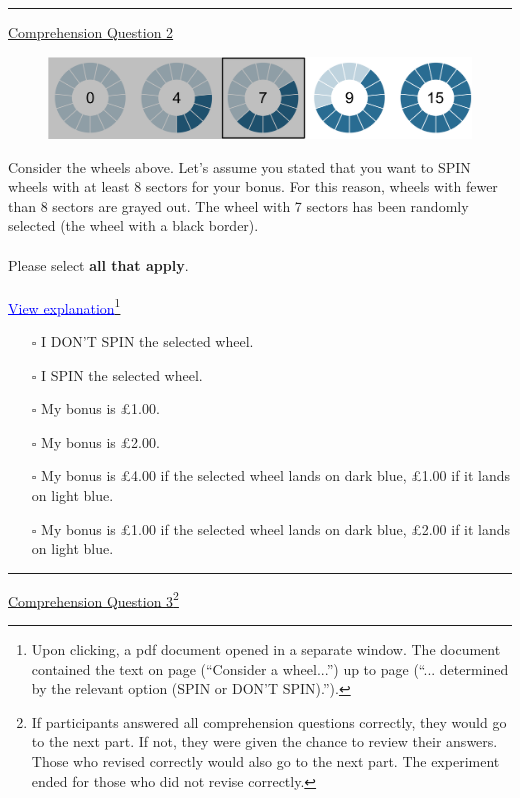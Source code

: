 \documentclass[pdftex,12pt, a4paper]{article}
\begin{document}
\noindent \rule{\linewidth}{0.4pt}
\newpage
\noindent \underline{Comprehension Question 2}

\begin{figure}[h!]
	\centering
	{\includegraphics[width=\linewidth]{Fig7_five_wheelsS2_15.pdf}}
\end{figure}
 
\noindent Consider the wheels above.
Let's assume you stated that you want to SPIN wheels with at least 8 sectors for your bonus.
For this reason, wheels with fewer than 8 sectors are grayed out.
The wheel with 7 sectors has been randomly selected (the wheel with a black border).\\
\\
\noindent Please select \textbf{all that apply}.\\
 \\
\noindent \textcolor{blue}{\underline{View explanation}}\footnote{
Upon clicking, a pdf document opened in a separate window.
The document contained the text on page \pageref{explanation} (``Consider a wheel...'') up to page \pageref{end} (``... determined by the relevant option (SPIN or DON'T SPIN).'').
}\\
\begin{itemize}
\item[$\square$] I DON'T SPIN the selected wheel.
\item[$\square$] I SPIN the selected wheel.
\item[$\square$] My bonus is £1.00.
\item[$\square$] My bonus is £2.00.
\item[$\square$] My bonus is £4.00 if the selected wheel lands on dark blue, £1.00 if it lands on light blue.
\item[$\square$] My bonus is £1.00 if the selected wheel lands on dark blue, £2.00 if it lands on light blue.
\end{itemize}

\noindent \rule{\linewidth}{0.4pt}
\newpage
\noindent \underline{Comprehension Question 3}\footnote{
If participants answered all comprehension questions correctly, they would go to the next part.
If not, they were given the chance to review their answers.
Those who revised correctly would also go to the next part.
The experiment ended for those who did not revise correctly.
}
 
\end{document}
